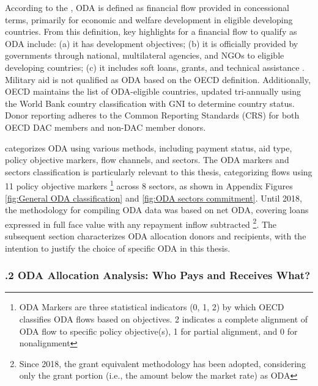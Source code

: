 According to the \textcite{oecd_ODA_Report_2023}, ODA is defined as financial flow provided in concessional terms, primarily for economic and welfare development in eligible developing countries. From this definition, key highlights for a financial flow to qualify as ODA include: (a) it has development objectives; (b) it is officially provided by governments through national, multilateral agencies, and NGOs to eligible developing countries; (c) it includes soft loans, grants, and technical assistance \parencite{oecd_ODA_Report_2023, staicu2017study}. Military aid is not qualified as ODA based on the OECD definition. Additionally, OECD maintains the list of ODA-eligible countries, updated tri-annually using the World Bank country classification with GNI to determine country status. Donor reporting adheres to the Common Reporting Standards (CRS) for both OECD DAC members and non-DAC member donors.



\textcite{oecd_ODA_Report_2023} categorizes ODA using various methods, including payment status, aid type, policy objective markers, flow channels, and sectors. The ODA markers and sectors classification is particularly relevant to this thesis, categorizing flows using 11 policy objective markers \footnote{ODA Markers are three statistical indicators (0, 1, 2) by which OECD classifies ODA flows based on objectives. 2 indicates a complete alignment of ODA flow to specific policy objective(s), 1 for partial alignment, and 0 for nonalignment} across 8 sectors, as shown in Appendix Figures \ref{fig:General ODA classification} and \ref{fig:ODA sectors commitment}. Until 2018, the methodology for compiling ODA data was based on net ODA, covering loans expressed in full face value with any repayment inflow subtracted \parencite{oecd_ODA_Report_2023} \footnote{Since 2018, the grant equivalent methodology has been adopted, considering only the grant portion (i.e., the amount below the market rate) as ODA}. The subsequent section characterizes ODA allocation donors and recipients, with the intention to justify the choice of specific ODA in this thesis.

\subsubsection*{.2  ODA Allocation Analysis: Who Pays and Receives What?}
